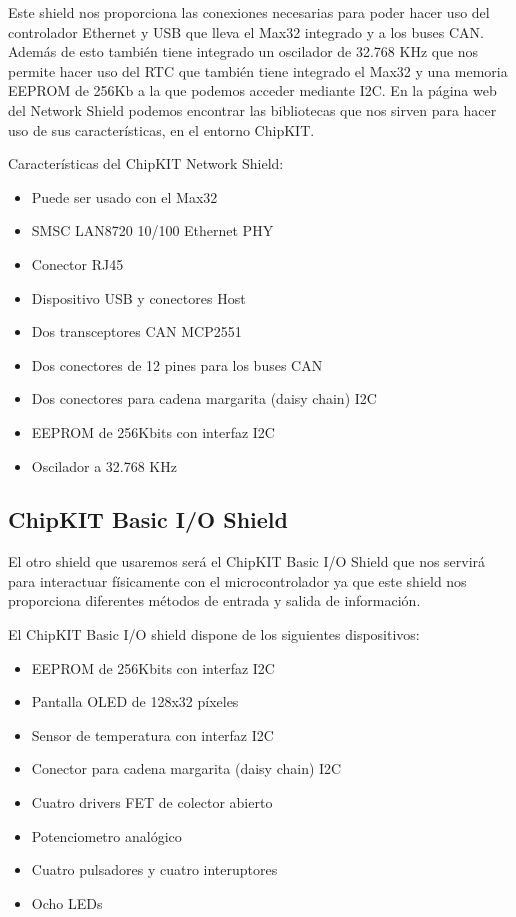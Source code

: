
Este shield nos proporciona las conexiones necesarias para poder hacer uso del controlador Ethernet y USB que lleva el Max32 integrado y a los buses CAN. Además de esto también tiene integrado un oscilador de 32.768 KHz que nos permite hacer uso del RTC que también tiene integrado el Max32 y una memoria EEPROM de 256Kb a la que podemos acceder mediante I2C. En la página web del Network Shield\cite{website:network_shield} podemos encontrar las bibliotecas que nos sirven para hacer uso de sus características, en el entorno ChipKIT.

Características del ChipKIT Network Shield:
\begin{itemize}
	\item Puede ser usado con el Max32
	\item SMSC LAN8720 10/100 Ethernet PHY
	\item Conector RJ45
	\item Dispositivo USB y conectores Host
	\item Dos transceptores CAN MCP2551
	\item Dos conectores de 12 pines para los buses CAN
	\item Dos conectores para cadena margarita (daisy chain) I2C
	\item EEPROM de 256Kbits con interfaz I2C
	\item Oscilador a 32.768 KHz
\end{itemize}

\subsection{ChipKIT Basic I/O Shield}
El otro shield que usaremos será el ChipKIT Basic I/O Shield que nos servirá para interactuar físicamente con el microcontrolador ya que este shield nos proporciona diferentes métodos de entrada y salida de información.


El ChipKIT Basic I/O shield dispone de los siguientes dispositivos:
\begin{itemize}
	\item EEPROM de 256Kbits con interfaz I2C
	\item Pantalla OLED de 128x32 píxeles
	\item Sensor de temperatura con interfaz I2C
	\item Conector para cadena margarita (daisy chain) I2C
	\item Cuatro drivers FET de colector abierto
	\item Potenciometro analógico
	\item Cuatro pulsadores y cuatro interuptores
	\item Ocho LEDs
\end{itemize}


